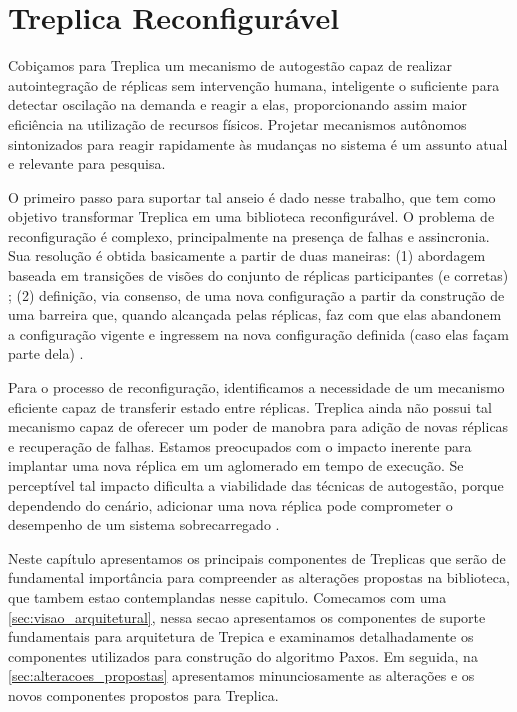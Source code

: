 \chapter{Treplica Reconfigurável}\label{cap2}

Cobiçamos para Treplica um mecanismo de autogestão capaz de realizar autointegração de
réplicas sem intervenção humana, inteligente o suficiente para detectar oscilação na
demanda e reagir a elas, proporcionando assim maior eficiência na utilização de recursos
físicos. Projetar mecanismos autônomos sintonizados para reagir rapidamente às mudanças no
sistema é um assunto atual e relevante para pesquisa.

O primeiro passo para suportar tal anseio é dado nesse trabalho, que tem como objetivo
transformar Treplica em uma biblioteca reconfigurável. O problema de reconfiguração é
complexo, principalmente na presença de falhas e assincronia. Sua resolução é obtida
basicamente a partir de duas maneiras: (1) abordagem baseada em transições de visões do
conjunto de réplicas participantes (e corretas) \cite{birman87a, birman87b}; (2)
definição, via consenso, de uma nova configuração a partir da construção de uma barreira
que, quando alcançada pelas réplicas, faz com que elas abandonem a configuração vigente e
ingressem na nova configuração definida (caso elas façam parte dela) \cite{lamport10}.

Para o processo de reconfiguração, identificamos a necessidade de um mecanismo eficiente
capaz de transferir estado entre réplicas. Treplica ainda não possui tal mecanismo capaz
de oferecer um poder de manobra para adição de novas réplicas e recuperação de falhas.
Estamos preocupados com o impacto inerente para implantar uma nova réplica em um
aglomerado em tempo de execução. Se perceptível tal impacto dificulta a viabilidade das
técnicas de autogestão, porque dependendo do cenário, adicionar uma nova réplica pode
comprometer o desempenho de um sistema sobrecarregado \cite{vilaca09}.

Neste capítulo apresentamos os principais componentes de Treplicas que serão de
fundamental importância para compreender as alterações propostas na biblioteca, que tambem
estao contemplandas nesse capitulo. Comecamos com uma \autoref{sec:visao_arquitetural},
nessa secao apresentamos os componentes de suporte fundamentais para arquitetura de
Trepica e examinamos detalhadamente os componentes utilizados para construção do algoritmo
Paxos. Em seguida, na \autoref{sec:alteracoes_propostas} apresentamos minunciosamente as
alterações e os novos componentes propostos para Treplica.


